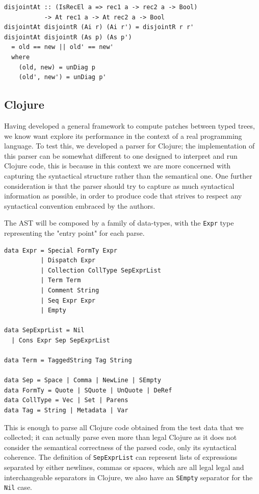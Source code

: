 \documentclass[11pt, titlepage]{article}
\newcommand{\toHaskell}[1]{\texttt{#1}\xspace}
\begin{document}
\begin{verbatim}
disjointAt :: (IsRecEl a => rec1 a -> rec2 a -> Bool)
           -> At rec1 a -> At rec2 a -> Bool
disjointAt disjointR (Ai r) (Ai r') = disjointR r r'
disjointAt disjointR (As p) (As p')
  = old == new || old' == new'
  where
    (old, new) = unDiag p
    (old', new') = unDiag p'
\end{verbatim}

\subsection{Clojure}
Having developed a general framework to compute patches between typed trees, we know want explore its performance in the context of a real programming language.
To test this, we developed a parser for Clojure; the implementation of this parser can be somewhat different to one designed to interpret and run Clojure code, this is because in this context we are more concerned with capturing the syntactical structure rather than the semantical one. One further consideration is that the parser should try to capture as much syntactical information as possible, in order to produce code that strives to respect any syntactical convention embraced by the authors.

The AST will be composed by a family of data-types, with the \toHaskell{Expr} type representing the "entry point" for each parse. 

\begin{verbatim}
data Expr = Special FormTy Expr
          | Dispatch Expr
          | Collection CollType SepExprList
          | Term Term 
          | Comment String
          | Seq Expr Expr
          | Empty
          
data SepExprList = Nil
  | Cons Expr Sep SepExprList
 
data Term = TaggedString Tag String

data Sep = Space | Comma | NewLine | SEmpty
data FormTy = Quote | SQuote | UnQuote | DeRef
data CollType = Vec | Set | Parens
data Tag = String | Metadata | Var
\end{verbatim}

This is enough to parse all Clojure code obtained from the test data that we collected; it can actually parse even more than legal Clojure as it does not consider the semantical correctness of the parsed code, only its syntactical coherence. The definition of \toHaskell{SepExprList} can represent lists of expressions separated by either newlines, commas or spaces, which are all legal legal and interchangeable separators in Clojure, we also have an \toHaskell{SEmpty} separator for the \toHaskell{Nil} case.
\end{document}
